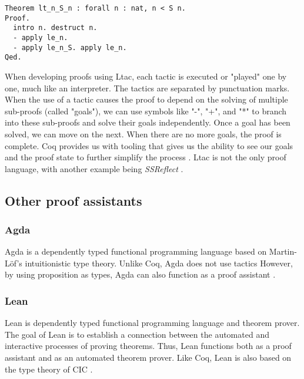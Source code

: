 \begin{minipage}{\linewidth}
\begin{lstlisting}[language=Coq, label={lst:ltac_ex}, caption={Example of Ltac syntax}]
Theorem lt_n_S_n : forall n : nat, n < S n.
Proof.
  intro n. destruct n.
  - apply le_n.
  - apply le_n_S. apply le_n.
Qed.
\end{lstlisting}
\end{minipage}

When developing proofs using Ltac, each tactic is executed or "played" one by one,
much like an interpreter. The tactics are separated by punctuation marks.
When the use of a tactic causes the proof to depend on the solving of multiple sub-proofs (called "goals"),
we can use symbols like "-", "+", and "*" to branch into these sub-proofs and solve their goals independently.
Once a goal has been solved, we can move on the next. When there are no more goals, the proof is complete.
Coq provides us with tooling that gives us the ability to see our goals and the proof state
to further simplify the process \cite{cide}.
Ltac is not the only proof language, with another example being \emph{SSReflect} \cite{cssr}.

\subsection{Other proof assistants}
\label{ssec:other_proof_assistants}

\subsubsection{Agda}
\label{sssec:agda}

Agda is a dependently typed functional programming language based on Martin-Löf's
intuitionistic type theory. Unlike Coq, Agda does not use tactics
However, by using proposition as types, Agda can also function as a proof assistant
\cite{agdatut}.

\subsubsection{Lean}
\label{sssec:lean}

Lean is dependently typed functional programming language and theorem prover.
The goal of Lean is to establish a connection between the automated and interactive processes of proving theorems.
Thus, Lean functions both as a proof assistant and as an automated theorem prover.
Like Coq, Lean is also based on the type theory of CIC
\cite{lean}.

